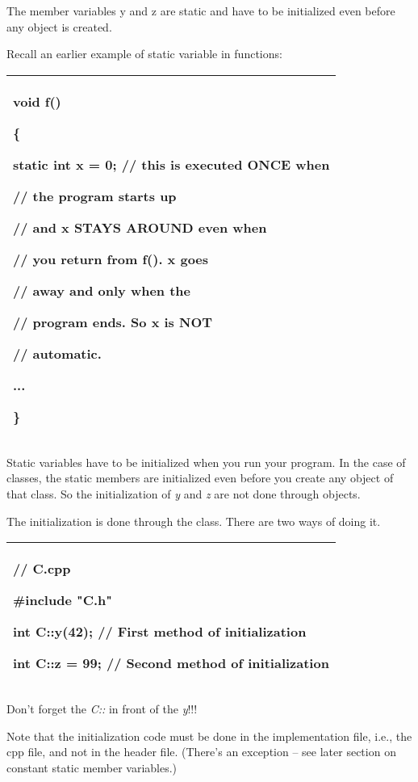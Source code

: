 \documentclass[
]{article}
\begin{document}
The member variables y and z are static and have to be initialized even
before any object is created.

Recall an earlier example of static variable in functions:

\begin{longtable}[]{@{}l@{}}
\toprule
\endhead
\begin{minipage}[t]{0.97\columnwidth}\raggedright
void f()

\{

static int x = 0; // this is executed ONCE when

// the program starts up

// and x STAYS AROUND even when

// you return from f(). x goes

// away and only when the

// program ends. So x is NOT

// automatic.

...

\}\strut
\end{minipage}\tabularnewline
\bottomrule
\end{longtable}

Static variables have to be initialized when you run your program. In
the case of classes, the static members are initialized even before you
create any object of that class. So the initialization of \emph{y} and
\emph{z} are not done through objects.

The initialization is done through the class. There are two ways of
doing it.

\begin{longtable}[]{@{}l@{}}
\toprule
\endhead
\begin{minipage}[t]{0.97\columnwidth}\raggedright
// C.cpp

\#include "C.h"

int C::y(42); // First method of initialization

int C::z = 99; // Second method of initialization\strut
\end{minipage}\tabularnewline
\bottomrule
\end{longtable}

Don't forget the \emph{C::} in front of the \emph{y}!!!

Note that the initialization code must be done in the implementation
file, i.e., the cpp file, and not in the header file. (There's an
exception -- see later section on constant static member variables.)
\end{document}

